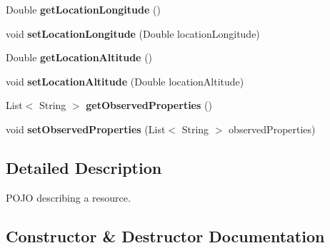 \begin{DoxyCompactItemize}
\item 
Double {\bfseries get\+Location\+Longitude} ()\hypertarget{classeu_1_1h2020_1_1symbiote_1_1model_1_1Resource_a5fcbb1ec6072cf5a701ae4352a65bd46}{}\label{classeu_1_1h2020_1_1symbiote_1_1model_1_1Resource_a5fcbb1ec6072cf5a701ae4352a65bd46}

\item 
void {\bfseries set\+Location\+Longitude} (Double location\+Longitude)\hypertarget{classeu_1_1h2020_1_1symbiote_1_1model_1_1Resource_ae96489478f235c953307435ff015c038}{}\label{classeu_1_1h2020_1_1symbiote_1_1model_1_1Resource_ae96489478f235c953307435ff015c038}

\item 
Double {\bfseries get\+Location\+Altitude} ()\hypertarget{classeu_1_1h2020_1_1symbiote_1_1model_1_1Resource_a3f2aafd1fda67ec7f0a6e3b67e7d5217}{}\label{classeu_1_1h2020_1_1symbiote_1_1model_1_1Resource_a3f2aafd1fda67ec7f0a6e3b67e7d5217}

\item 
void {\bfseries set\+Location\+Altitude} (Double location\+Altitude)\hypertarget{classeu_1_1h2020_1_1symbiote_1_1model_1_1Resource_a132696531b8c2f1ec2dd6729eaadc528}{}\label{classeu_1_1h2020_1_1symbiote_1_1model_1_1Resource_a132696531b8c2f1ec2dd6729eaadc528}

\item 
List$<$ String $>$ {\bfseries get\+Observed\+Properties} ()\hypertarget{classeu_1_1h2020_1_1symbiote_1_1model_1_1Resource_a2aaf59e1be5b0c974a31e106adfa6c43}{}\label{classeu_1_1h2020_1_1symbiote_1_1model_1_1Resource_a2aaf59e1be5b0c974a31e106adfa6c43}

\item 
void {\bfseries set\+Observed\+Properties} (List$<$ String $>$ observed\+Properties)\hypertarget{classeu_1_1h2020_1_1symbiote_1_1model_1_1Resource_a826dbee60cf539ffbf1a088496ac7e11}{}\label{classeu_1_1h2020_1_1symbiote_1_1model_1_1Resource_a826dbee60cf539ffbf1a088496ac7e11}

\end{DoxyCompactItemize}


\subsection{Detailed Description}
P\+O\+JO describing a resource. 

\subsection{Constructor \& Destructor Documentation}
